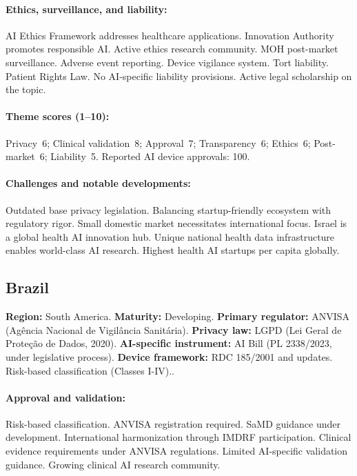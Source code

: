 {\paragraph{Ethics, surveillance, and liability:}
AI Ethics Framework addresses healthcare applications. Innovation Authority promotes responsible AI. Active ethics research community.
MOH post-market surveillance. Adverse event reporting. Device vigilance system.
Tort liability. Patient Rights Law. No AI-specific liability provisions. Active legal scholarship on the topic.

\paragraph{Theme scores (1--10):}
Privacy~6;
Clinical validation~8;
Approval~7;
Transparency~6;
Ethics~6;
Post-market~6;
Liability~5.
Reported AI device approvals: 100.

\paragraph{Challenges and notable developments:}
Outdated base privacy legislation. Balancing startup-friendly ecosystem with regulatory rigor. Small domestic market necessitates international focus.
Israel is a global health AI innovation hub. Unique national health data infrastructure enables world-class AI research. Highest health AI startups per capita globally.


\subsection{Brazil}
\textbf{Region:} South America.
\textbf{Maturity:} Developing.
\textbf{Primary regulator:} ANVISA (Agência Nacional de Vigilância Sanitária).
\textbf{Privacy law:} LGPD (Lei Geral de Proteção de Dados, 2020).
\textbf{AI-specific instrument:} AI Bill (PL 2338/2023, under legislative process).
\textbf{Device framework:} RDC 185/2001 and updates. Risk-based classification (Classes I-IV)..

\paragraph{Approval and validation:}
Risk-based classification. ANVISA registration required. SaMD guidance under development. International harmonization through IMDRF participation.
Clinical evidence requirements under ANVISA regulations. Limited AI-specific validation guidance. Growing clinical AI research community.

}
